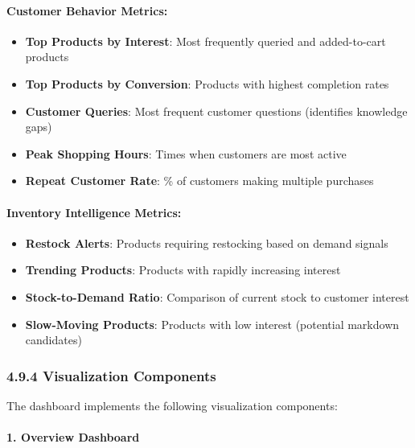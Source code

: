 \documentclass[12pt,a4paper]{article}
\begin{document}
\paragraph{Customer Behavior Metrics:}

\begin{itemize}
    \item \textbf{Top Products by Interest}: Most frequently queried and added-to-cart products
    \item \textbf{Top Products by Conversion}: Products with highest completion rates
    \item \textbf{Customer Queries}: Most frequent customer questions (identifies knowledge gaps)
    \item \textbf{Peak Shopping Hours}: Times when customers are most active
    \item \textbf{Repeat Customer Rate}: \% of customers making multiple purchases
\end{itemize}

\paragraph{Inventory Intelligence Metrics:}

\begin{itemize}
    \item \textbf{Restock Alerts}: Products requiring restocking based on demand signals
    \item \textbf{Trending Products}: Products with rapidly increasing interest
    \item \textbf{Stock-to-Demand Ratio}: Comparison of current stock to customer interest
    \item \textbf{Slow-Moving Products}: Products with low interest (potential markdown candidates)
\end{itemize}

\subsubsection{4.9.4 Visualization Components}

The dashboard implements the following visualization components:

\paragraph{1. Overview Dashboard}
\end{document}
